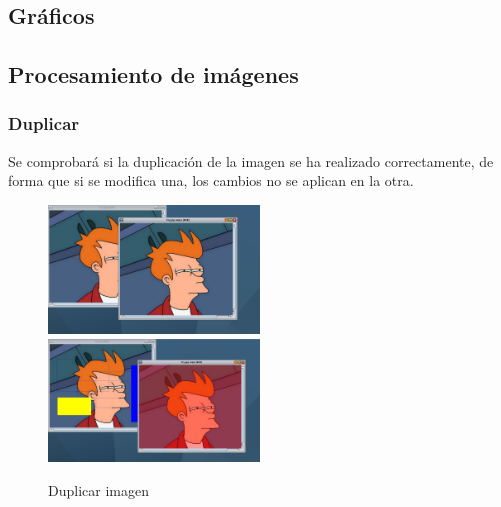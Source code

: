 \subsection{Gráficos}
\subsection{Procesamiento de imágenes}
\subsubsection{Duplicar}
Se comprobará si la duplicación de la imagen se ha realizado correctamente, de forma que si se modifica una, los cambios no se aplican en la otra.
\vskip0.3cm
\begin{figure}[H]
 \centering
  \includegraphics[width=0.5\textwidth]{imagenes/duplicar1.png}
  \includegraphics[width=0.5\textwidth]{imagenes/duplicar2.jpg}
 \caption{Duplicar imagen}
 \label{diseño}
 \end{figure}
